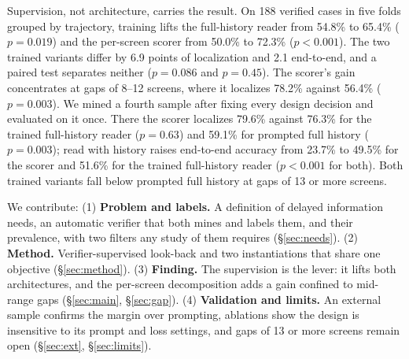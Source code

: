 Supervision, not architecture, carries the result. On 188 verified cases in five folds grouped by trajectory, training lifts the full-history reader from 54.8\% to 65.4\% ($p=0.019$) and the per-screen scorer from 50.0\% to 72.3\% ($p<0.001$). The two trained variants differ by 6.9 points of localization and 2.1 end-to-end, and a paired test separates neither ($p=0.086$ and $p=0.45$). The scorer's gain concentrates at gaps of 8--12 screens, where it localizes 78.2\% against 56.4\% ($p=0.003$). We mined a fourth sample after fixing every design decision and evaluated on it once. There the scorer localizes 79.6\% against 76.3\% for the trained full-history reader ($p=0.63$) and 59.1\% for prompted full history ($p=0.003$); read with history raises end-to-end accuracy from 23.7\% to 49.5\% for the scorer and 51.6\% for the trained full-history reader ($p<0.001$ for both). Both trained variants fall below prompted full history at gaps of 13 or more screens.

We contribute: (1) \textbf{Problem and labels.} A definition of delayed information needs, an automatic verifier that both mines and labels them, and their prevalence, with two filters any study of them requires (\S\ref{sec:needs}). (2) \textbf{Method.} Verifier-supervised look-back and two instantiations that share one objective (\S\ref{sec:method}). (3) \textbf{Finding.} The supervision is the lever: it lifts both architectures, and the per-screen decomposition adds a gain confined to mid-range gaps (\S\ref{sec:main}, \S\ref{sec:gap}). (4) \textbf{Validation and limits.} An external sample confirms the margin over prompting, ablations show the design is insensitive to its prompt and loss settings, and gaps of 13 or more screens remain open (\S\ref{sec:ext}, \S\ref{sec:limits}).
